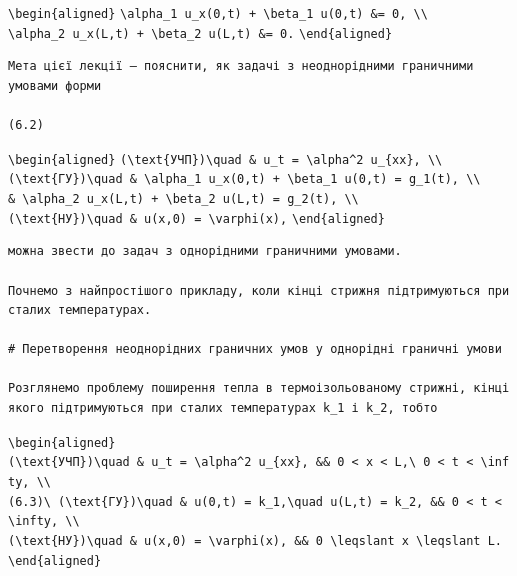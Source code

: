 \documentclass[
  ukrainian,
]{article}
\begin{document}
\texttt{\textbackslash{}begin\{aligned\}}
\texttt{\textbackslash{}alpha\_1\ u\_x(0,t)\ +\ \textbackslash{}beta\_1\ u(0,t)\ \&=\ 0,\ \textbackslash{}\textbackslash{}}
\texttt{\textbackslash{}alpha\_2\ u\_x(L,t)\ +\ \textbackslash{}beta\_2\ u(L,t)\ \&=\ 0.}
\texttt{\textbackslash{}end\{aligned\}}

\begin{verbatim}
Мета цієї лекції — пояснити, як задачі з неоднорідними граничними умовами форми

(6.2)
\end{verbatim}

\texttt{\textbackslash{}begin\{aligned\}}
\texttt{(\textbackslash{}text\{УЧП\})\textbackslash{}quad\ \&\ u\_t\ =\ \textbackslash{}alpha\^{}2\ u\_\{xx\},\ \textbackslash{}\textbackslash{}}
\texttt{(\textbackslash{}text\{ГУ\})\textbackslash{}quad\ \&\ \textbackslash{}alpha\_1\ u\_x(0,t)\ +\ \textbackslash{}beta\_1\ u(0,t)\ =\ g\_1(t),\ \textbackslash{}\textbackslash{}}
\texttt{\&\ \textbackslash{}alpha\_2\ u\_x(L,t)\ +\ \textbackslash{}beta\_2\ u(L,t)\ =\ g\_2(t),\ \textbackslash{}\textbackslash{}}
\texttt{(\textbackslash{}text\{НУ\})\textbackslash{}quad\ \&\ u(x,0)\ =\ \textbackslash{}varphi(x),}
\texttt{\textbackslash{}end\{aligned\}}

\begin{verbatim}
можна звести до задач з однорідними граничними умовами.

Почнемо з найпростішого прикладу, коли кінці стрижня підтримуються при сталих температурах.

# Перетворення неоднорідних граничних умов у однорідні граничні умови

Розглянемо проблему поширення тепла в термоізольованому стрижні, кінці якого підтримуються при сталих температурах k_1 і k_2, тобто
\end{verbatim}

\texttt{\textbackslash{}begin\{aligned\}}
\texttt{(\textbackslash{}text\{УЧП\})\textbackslash{}quad\ \&\ u\_t\ =\ \textbackslash{}alpha\^{}2\ u\_\{xx\},\ \&\&\ 0\ \textless{}\ x\ \textless{}\ L,\textbackslash{}\ 0\ \textless{}\ t\ \textless{}\ \textbackslash{}infty,\ \textbackslash{}\textbackslash{}}
\texttt{(6.3)\textbackslash{}\ (\textbackslash{}text\{ГУ\})\textbackslash{}quad\ \&\ u(0,t)\ =\ k\_1,\textbackslash{}quad\ u(L,t)\ =\ k\_2,\ \&\&\ 0\ \textless{}\ t\ \textless{}\ \textbackslash{}infty,\ \textbackslash{}\textbackslash{}}
\texttt{(\textbackslash{}text\{НУ\})\textbackslash{}quad\ \&\ u(x,0)\ =\ \textbackslash{}varphi(x),\ \&\&\ 0\ \textbackslash{}leqslant\ x\ \textbackslash{}leqslant\ L.}
\texttt{\textbackslash{}end\{aligned\}}
\end{document}
